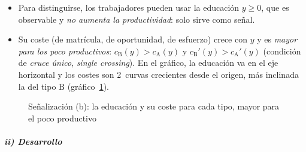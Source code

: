 \documentclass[11pt]{article}
\begin{document}
\begin{itemize}
\item Para distinguirse, los trabajadores pueden usar la educación $y\geq 0$, que es observable y \emph{no aumenta la productividad}: solo sirve como señal.
\item Su coste (de matrícula, de oportunidad, de esfuerzo) crece con $y$ y es \emph{mayor para los poco productivos}: $c_{\mathrm{B}}(y)>c_{\mathrm{A}}(y)$ y $c_{\mathrm{B}}'(y)>c_{\mathrm{A}}'(y)$ (condición de \emph{cruce único}, \emph{single crossing}). En el gráfico, la educación va en el eje horizontal y los costes son 2~curvas crecientes desde el origen, más inclinada la del tipo $\mathrm{B}$ (gráfico~\ref{fig:spence-b}).
\end{itemize}

\begin{figure}[H]
\centering
\caption{Señalización (b): la educación y su coste para cada tipo, mayor para el poco productivo}\label{fig:spence-b}
\end{figure}

\subparagraph{ii) Desarrollo}
\end{document}
